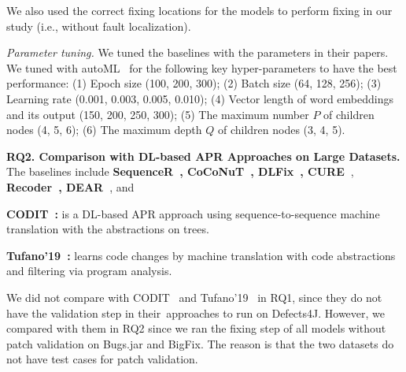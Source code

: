 
We also used the correct fixing locations for the models to perform
fixing in our study (i.e., without fault localization).



{\em Parameter tuning.} We tuned the baselines with the
parameters in their papers.
We tuned {\tool} with autoML~\cite{NNI} for the following key
hyper-parameters to have the best performance: (1) Epoch size (100,
200, 300); (2) Batch size (64, 128, 256); (3) Learning rate (0.001,
0.003, 0.005, 0.010); (4) Vector length of word embeddings and its
output (150, 200, 250, 300); (5) The maximum number $P$ of children
nodes (4, 5, 6); (6) The maximum depth $Q$ of children nodes (3, 4,
5).

\vspace{2pt} {\bf RQ2. Comparison with DL-based APR Approaches on
  Large Datasets.} The baselines include {\bf
  Sequen\-ceR~\cite{chen2018sequencer},
  CoCoNuT~\cite{lutellier2020coconut}, DLFix~\cite{icse20},
  CURE~\cite{cure-icse21}}, {\bf Recoder~\cite{recoder-fse21},
  DEAR~\cite{icse22}}, and

{\bf CODIT~\cite{chakrabortycodit}:} is a DL-based APR approach
using sequence-to-sequence machine translation with the
abstractions on trees.

{\bf Tufano'19~\cite{tufano2019learning}:} learns code changes by
machine translation with code abstractions and
filtering via program analysis.

We did not compare with CODIT~\cite{chakrabortycodit} and
Tufano'19~\cite{tufano2019learning} in RQ1, since they do not have
the validation step in their~approaches to run on Defects4J.
%
However, we compared {\tool} with them in RQ2 since we ran the fixing
step of all models without patch validation on Bugs.jar and
BigFix. The reason is that the two datasets do not have test cases for
patch validation.

